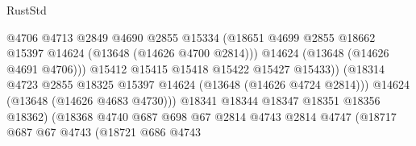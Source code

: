 \begin{lexlean}{RustStd}
\begin{coremodule}
                                              @4706
                                              @4713
                                              @2849
                                              @4690
                                              @2855
                                              @15334
                                              (@18651
                                                @4699
                                                @2855
                                                @18662
                                                @15397
                                                @14624
                                                (@13648 (@14626 @4700 @2814)))
                                              @14624
                                              (@13648 (@14626 @4691 @4706)))
                                            @15412
                                            @15415
                                            @15418
                                            @15422
                                            @15427
                                            @15433))
                                        (@18314
                                          @4723
                                          @2855
                                          @18325
                                          @15397
                                          @14624
                                          (@13648 (@14626 @4724 @2814)))
                                        @14624
                                        (@13648 (@14626 @4683 @4730)))
                                      @18341
                                      @18344
                                      @18347
                                      @18351
                                      @18356
                                      @18362)
                                    (@18368
                                      @4740
                                      @687
                                      @698
                                      @67
                                      @2814
                                      @4743
                                      @2814
                                      @4747
                                      (@18717
                                        @687
                                        @67
                                        @4743
                                        (@18721
                                          @686
                                          @4743

\end{coremodule}
\end{lexlean}
